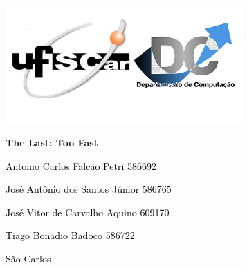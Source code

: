 \documentclass[a4paper]{article}
\title{}
\author{Antonio Carlos Falcão Petri}
\date{2015-04-23}
\begin{document}
\clearpage\setcounter{page}{1}\pagestyle{Standard}
{\centering 
\includegraphics[width=3.5602in,height=1.7756in]{T1-img1.png} \par}


\bigskip


\bigskip


\bigskip


\bigskip

{\centering
\foreignlanguage{english}{\textbf{The Last: Too Fast}}
\par}


\bigskip


\bigskip


\bigskip


\bigskip

{\raggedleft
\foreignlanguage{english}{\textcolor{black}{Antonio Carlos Falcão Petri
586692}}
\par}

{\raggedleft
\textcolor{black}{José Antônio dos Santos Júnior 586765}
\par}

{\raggedleft
\textcolor{black}{José Vitor de Carvalho Aquino 609170}
\par}

{\raggedleft
\textcolor{black}{Tiago Bonadio Badoco 586722}
\par}


\bigskip


\bigskip


\bigskip


\bigskip


\bigskip


\bigskip


\bigskip


\bigskip


\bigskip


\bigskip


\bigskip


\bigskip


\bigskip

{\centering
\textcolor{black}{São Carlos}
\par}
\end{document}

